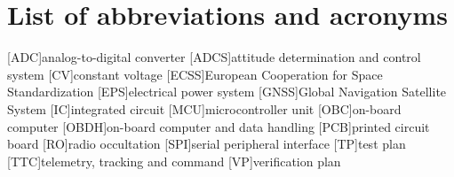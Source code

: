 %
%
%
%
%
%
%
%
%
%

\chapter*{List of abbreviations and acronyms}

\begin{acronym}[XXXXXXXXXX]
    [ADC]{analog-to-digital converter}
    [ADCS]{attitude determination and control system}
    [CV]{constant voltage}
    [ECSS]{European Cooperation for Space Standardization}
    [EPS]{electrical power system}
    [GNSS]{Global Navigation Satellite System}
    [IC]{integrated circuit}
    [MCU]{microcontroller unit}
    [OBC]{on-board computer}
    [OBDH]{on-board computer and data handling}
    [PCB]{printed circuit board}
    [RO]{radio occultation}
    [SPI]{serial peripheral interface}
    [TP]{test plan}
    [TTC]{telemetry, tracking and command}
    [VP]{verification plan}
\end{acronym}